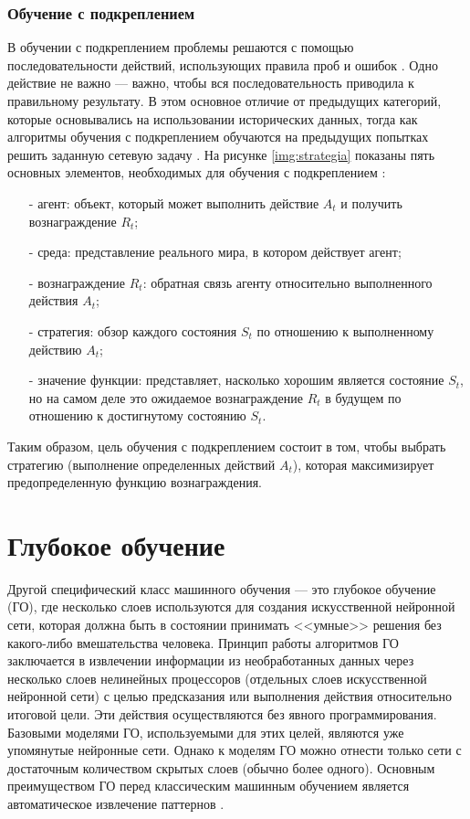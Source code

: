 \subsubsection{Обучение с подкреплением}

В обучении с подкреплением проблемы решаются с помощью последовательности действий, использующих правила проб и ошибок . Одно действие не важно — важно, чтобы вся последовательность приводила к правильному результату. В этом основное отличие от предыдущих категорий, которые основывались на использовании исторических данных, тогда как алгоритмы обучения с подкреплением обучаются на предыдущих попытках решить заданную сетевую задачу \cite{surverymashin}. На рисунке \ref{img:strategia} показаны пять основных элементов, необходимых для обучения с подкреплением \cite{transactonne}:


\FloatBarrier

\begin{itemize}
	\item[-]  агент: объект, который может выполнить действие $A_{t}$ и получить вознаграждение $R_{t}$;
	\item[-] среда: представление реального мира, в котором действует агент;
	\item[-] вознаграждение $R_{t}$: обратная связь агенту относительно выполненного действия $A_{t}$;
	\item[-] стратегия: обзор каждого состояния $S_{t}$ по отношению к выполненному действию $A_{t}$;
	\item[-] значение функции: представляет, насколько хорошим является состояние $S_{t}$, но на самом деле это ожидаемое вознаграждение $R_{t}$ в будущем по отношению к достигнутому состоянию $S_{t}$.
\end{itemize}

Таким образом, цель обучения с подкреплением состоит в том, чтобы выбрать стратегию (выполнение определенных действий $A_{t}$), которая максимизирует предопределенную функцию вознаграждения.

\section{Глубокое обучение}

Другой специфический класс машинного обучения — это глубокое обучение (ГО), где несколько слоев используются для создания искусственной нейронной сети, которая должна быть в состоянии принимать <<умные>> решения без какого-либо вмешательства человека. Принцип работы алгоритмов ГО заключается в извлечении информации из необработанных данных через несколько слоев нелинейных процессоров (отдельных слоев искусственной нейронной сети) с целью предсказания или выполнения действия относительно итоговой цели. Эти действия осуществляются без явного программирования. Базовыми моделями ГО, используемыми для этих целей, являются уже упомянутые нейронные сети. Однако к моделям ГО можно отнести только сети с достаточным количеством скрытых слоев (обычно более одного). Основным преимуществом ГО перед классическим машинным обучением является автоматическое извлечение паттернов \cite{deeplearninmob}.

